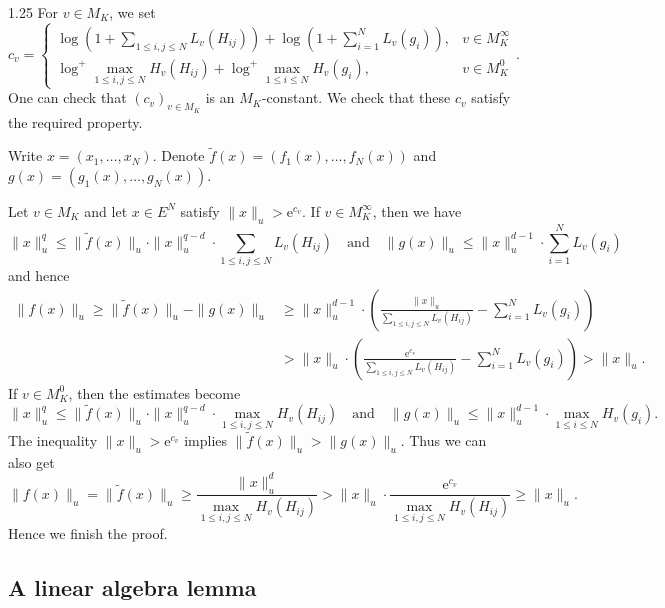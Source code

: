 \documentclass[12pt]{article}
\begin{document}
\begin{spacing}{1.25}
For $v\in M_K$, we set
$$
c_v=\left\{
\begin{array}{cc}
\log\left(1+\sum\limits_{1\leq i,j\leq N}L_v(H_{ij})\right)+\log\left(1+\sum\limits_{i=1}^{N}L_v(g_i)\right), & v\in M_{K}^{\infty} \\
\log^+\max\limits_{1\leq i,j\leq N}H_v(H_{ij})+\log^+\max\limits_{1\leq i\leq N}H_v(g_i), & v\in M_K^0
\end{array}
\right..
$$
One can check that $(c_v)_{v\in M_K}$ is an $M_K$-constant. We check that these $c_v$ satisfy the required property.

Write $x=(x_1,\dots,x_N)$. Denote $\tilde{f}(x)=(f_1(x),\dots,f_N(x))$ and $g(x)=(g_1(x),\dots,g_N(x))$.

Let $v\in M_K$ and let $x\in E^N$ satisfy $\|x\|_u>\mathrm{e}^{c_v}$. If $v\in M_K^{\infty}$, then we have
$$
\|x\|_u^q\leq\|\tilde{f}(x)\|_u\cdot\|x\|_u^{q-d}\cdot\sum\limits_{1\leq i,j\leq N}L_v(H_{ij})\quad\text{and}\quad\|g(x)\|_u\leq\|x\|_u^{d-1}\cdot\sum\limits_{i=1}^{N}L_v(g_i)
$$
and hence
\begin{align*}
\|f(x)\|_u\geq\|\tilde{f}(x)\|_u-\|g(x)\|_u
&\geq\|x\|_u^{d-1}\cdot\left(\frac{\|x\|_u}{\sum\limits_{1\leq i,j\leq N}L_v(H_{ij})}-\sum\limits_{i=1}^{N}L_v(g_i)\right) \\
&>\|x\|_u\cdot\left(\frac{\mathrm{e}^{c_v}}{\sum\limits_{1\leq i,j\leq N}L_v(H_{ij})}-\sum\limits_{i=1}^{N}L_v(g_i)\right)>\|x\|_u.
\end{align*}
If $v\in M_K^0$, then the estimates become
$$
\|x\|_u^q\leq\|\tilde{f}(x)\|_u\cdot\|x\|_u^{q-d}\cdot\max\limits_{1\leq i,j\leq N}H_v(H_{ij})\quad\text{and}\quad\|g(x)\|_u\leq\|x\|_u^{d-1}\cdot\max\limits_{1\leq i\leq N}H_v(g_i).
$$
The inequality $\|x\|_u>\mathrm{e}^{c_v}$ implies $\|\tilde{f}(x)\|_u>\|g(x)\|_u$. Thus we can also get
$$
\|f(x)\|_u=\|\tilde{f}(x)\|_u\geq\frac{\|x\|_u^d}{\max\limits_{1\leq i,j\leq N}H_v(H_{ij})}>\|x\|_u\cdot\frac{\mathrm{e}^{c_v}}{\max\limits_{1\leq i,j\leq N}H_v(H_{ij})}\geq\|x\|_u.
$$
Hence we finish the proof.
\endproof















\subsection{A linear algebra lemma}\label{sec2.2}


\end{spacing}
\end{document}
